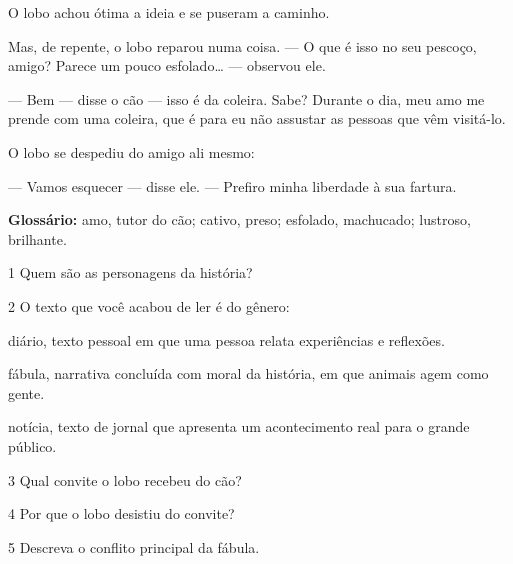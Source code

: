 \begin{conteudo}
\begin{conteudo}
\begin{conteudo}
\begin{conteudo}
\begin{myquote}
O lobo achou ótima a ideia e se puseram a caminho.

Mas, de repente, o lobo reparou numa coisa. --- O que é isso no seu
pescoço, amigo? Parece um pouco esfolado\ldots{} --- observou ele.

--- Bem --- disse o cão --- isso é da coleira. Sabe? Durante o dia,
meu amo me prende com uma coleira, que é para eu não assustar as pessoas
que vêm visitá-lo.

O lobo se despediu do amigo ali mesmo:

--- Vamos esquecer --- disse ele. --- Prefiro minha liberdade à sua
fartura.


\begin{small}
\textbf{Glossário:} amo, tutor do cão; cativo, preso; esfolado, machucado; lustroso, brilhante.
\end{small}
\end{myquote}

\num{1} Quem são as personagens da história?


\num{2} O texto que você acabou de ler é do gênero:

\begin{escolha}
\begin{boxlist}
 diário, texto pessoal em que uma pessoa relata experiências e reflexões.

 fábula, narrativa concluída com moral da história, em que animais agem como gente.

 notícia, texto de jornal que apresenta um acontecimento real para o grande público.
\end{boxlist}
\end{escolha}

\num{3} Qual convite o lobo recebeu do cão?


\num{4} Por que o lobo desistiu do convite?


\num{5} Descreva o conflito principal da fábula.


\end{conteudo}
\end{conteudo}
\end{conteudo}
\end{conteudo}

